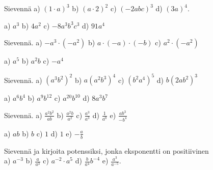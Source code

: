 \begin{tehtavasivu}
 \begin{tehtava}
        Sievennä 
        a) $(1\cdot a)^3$ 
        b) $(a\cdot 2)^2$ 
        c) $(-2abc)^3$ 
        d) $(3a)^4$.

        \begin{vastaus}
            a) $a^3$ 
            b) $4a^2$ 
            c) $-8a^3b^3c^3$ 
            d) $91a^4$
        \end{vastaus}
    \end{tehtava}
    \begin{tehtava}
        Sievennä. 
        a) $-a^3\cdot(-a^2)$ 
        b) $a\cdot(-a)\cdot(-b)$ 
        c) $a^2\cdot(-a^2)$
        
        \begin{vastaus}
            a) $a^5$ 
            b) $a^2b$ 
            c) $-a^4$
        \end{vastaus}
    \end{tehtava}

    \begin{tehtava}
        Sievennä. 
        a) $(a^3b^2)^2$ 
        b) $a(a^2b^3)^4$ 
        c) $(b^2a^4)^5$ 
        d) $b(2ab^2)^3$
        
        \begin{vastaus}
            a) $a^6b^4$ 
            b) $a^9b^{12}$ 
            c) $a^{20}b^{10}$ 
            d) $8a^3b^7$
        \end{vastaus}
    \end{tehtava}
      
    
    \begin{tehtava}
        Sievennä. 
        a) $\frac{a^2b^2}{ab}$ 
        b) $\frac{a^2b}{a^2}$ 
        c) $\frac{a^3}{a^3}$ 
        d) $\frac{1}{a^0}$ 
        e) $\frac{ab^3}{-b^4}$
        
        \begin{vastaus}
            a) $ab$ 
            b) $b$ 
            c) $1$ 
            d) $1$ 
            e) $-\frac{a}{b}$
        \end{vastaus}
    \end{tehtava}
    
   
    
    \begin{tehtava}
         Sievennä ja kirjoita potenssiksi, jonka eksponentti on positiivinen\\
        a) $a^{-3}$ 
        b) $\frac{a}{a^3}$ 
        c) $a^{-2}\cdot a^5$ 
        d) $\frac{b}{a^4}b^{-4}$ 
        e) $\frac{a^3}{a^{-5}}$.
        

\end{tehtava}
\end{tehtavasivu}
